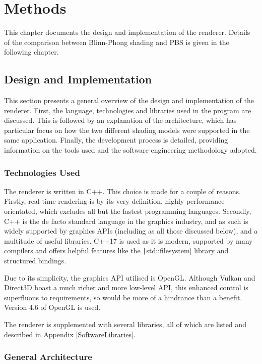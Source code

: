 \chapter{Methods}
\label{chapter2}

This chapter documents the design and implementation of the renderer. Details of the comparison between Blinn-Phong shading and PBS is given in the following chapter.

\section{Design and Implementation}

This section presents a general overview of the design and implementation of the renderer. First, the language, technologies and libraries used in the program are discussed. This is followed by an explanation of the architecture, which has particular focus on how the two different shading models were supported in the same application. Finally, the development process is detailed, providing information on the tools used and the software engineering methodology adopted.

\subsection{Technologies Used}

The renderer is written in C++. This choice is made for a couple of reasons. Firstly, real-time rendering is by its very definition, highly performance orientated, which excludes all but the fastest programming languages. Secondly, C++ is the de facto standard language in the graphics industry, and as such is widely supported by graphics APIs (including as all those discussed below), and a multitude of useful libraries. C++17 is used as it is modern, supported by many compilers and offers helpful features like the \texttt|std::filesystem| library and structured bindings.

Due to its simplicity, the graphics API utilised is OpenGL. Although Vulkan and Direct3D boast a much richer and more low-level API, this enhanced control is superfluous to requirements, so would be more of a hindrance than a benefit. Version 4.6 of OpenGL is used.

The renderer is supplemented with several libraries, all of which are listed and described in Appendix \ref{SoftwareLibraries}.

\subsection{General Architecture}

